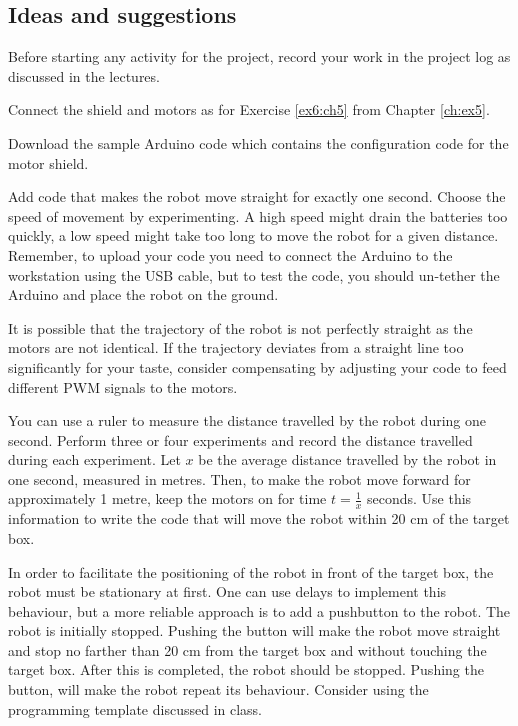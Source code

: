 \documentclass[12pt]{book}
\begin{document}
\subsection{Ideas and suggestions}

\begin{compactenum}[1)]
  \item Before starting any activity for the project, record your work
    in the project log as discussed in the lectures.
\item Connect the shield and motors as for Exercise \ref*{ex6:ch5}
  from Chapter
  \ref*{ch:ex5}. 
\item Download the sample Arduino code which contains the
  configuration code for the motor shield. 
\item Add code that makes the robot move straight for exactly one
  second. Choose the speed of movement by experimenting. A high speed
  might drain the batteries too quickly, a low speed might take too
  long to move the robot for a given distance. Remember, to upload
  your code you need to connect the Arduino to the workstation using
  the USB cable, but to test the code, you should un-tether the
  Arduino and place the robot on the ground.

\item  It is possible that
  the trajectory of the robot is not perfectly straight as the motors
  are not identical. If the trajectory deviates from a straight line
  too significantly for your taste, consider compensating by adjusting
  your code to feed different PWM signals to the motors. 

\item You can use a ruler to measure the distance travelled by the robot
  during one second. Perform three or four experiments and record the
  distance travelled during each experiment. Let $x$ be the average
  distance travelled by the robot in one second, measured in
  metres. Then, to make the robot move forward for approximately 1 metre,
  keep the motors on for time $t=\frac{1}{x}$ seconds. Use this information to
  write the code that will move the robot within 20 cm of the target box.

\item In order to facilitate the positioning of the robot in front of
  the target box, the robot must be stationary at first. One can use
  delays to implement this behaviour, but a more reliable approach is
  to add a pushbutton to the robot. The robot is initially
  stopped. Pushing the button will make the robot move straight 
  and stop no farther than 20 cm
from the target box and without touching the target box.
  After this is completed, the robot should be
  stopped. Pushing the button, will make the robot repeat its
  behaviour. Consider using the programming template discussed in class.
\end{compactenum}
\end{document}
